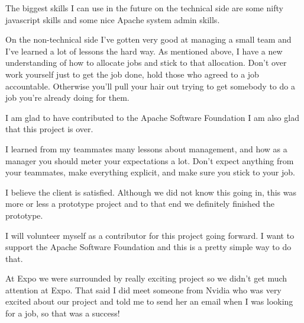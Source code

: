The biggest skills I can use in the future on the technical side are some nifty javascript skills and some nice Apache system admin skills.

On the non-technical side I've gotten very good at managing a small team and I've learned a lot of lessons the hard way.
As mentioned above, I have a new understanding of how to allocate jobs and stick to that allocation.
Don't over work yourself just to get the job done, hold those who agreed to a job accountable.
Otherwise you'll pull your hair out trying to get somebody to do a job you're already doing for them.

I am glad to have contributed to the Apache Software Foundation I am also glad that this project is over.

I learned from my teammates many lessons about management, and how as a manager you should meter your expectations a lot.
Don't expect anything from your teammates, make everything explicit, and make sure you stick to your job.

I believe the client is satisfied.
Although we did not know this going in, this was more or less a prototype project and to that end we definitely finished the prototype.

I will volunteer myself as a contributor for this project going forward.
I want to support the Apache Software Foundation and this is a pretty simple way to do that.

At Expo we were surrounded by really exciting project so we didn't get much attention at Expo.
That said I did meet someone from Nvidia who was very excited about our project and told me to send her an email when I was looking for a job, so that was a success!
